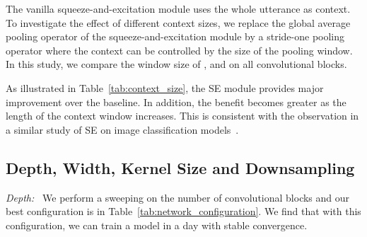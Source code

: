 \documentclass[a4paper]{article}
\begin{document}
The vanilla squeeze-and-excitation module uses the whole utterance as context. To investigate the effect of different context sizes, we replace the global average pooling operator of the squeeze-and-excitation module by a stride-one pooling operator where the context can be controlled by the size of the pooling window. In this study, we compare the window size of ,  and  on all convolutional blocks.

As illustrated in Table~\ref{tab:context_size}, the SE module provides major improvement over the baseline. In addition, the benefit becomes greater as the length of the context window increases. This is consistent with the observation in a similar study of SE on image classification models~\cite{hu2018gather}.


\begin{table}[h!]
\centering
\caption{Effect of the context window size on WER. All models have .}

\label{tab:context_size}
\end{table}

\vspace{-0.1in}
\subsection{Depth, Width, Kernel Size and Downsampling}
\vspace{-0.02in}
\label{sec:exp:filter_size}
\textit{Depth:\ } We perform a sweeping on the number of convolutional blocks and our best configuration is in Table~\ref{tab:network_configuration}. We find that with this configuration, we can train a model in a day with stable convergence.
\end{document}
